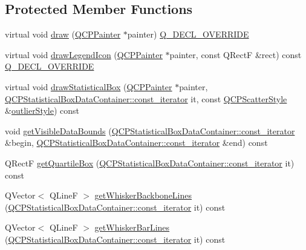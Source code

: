 \subsection*{Protected Member Functions}
\begin{DoxyCompactItemize}
\item 
virtual void \hyperlink{class_q_c_p_statistical_box_afcff35fa79728cfe10e80e0702014fea}{draw} (\hyperlink{class_q_c_p_painter}{Q\+C\+P\+Painter} $\ast$painter) \hyperlink{qcustomplot_8h_a42cc5eaeb25b85f8b52d2a4b94c56f55}{Q\+\_\+\+D\+E\+C\+L\+\_\+\+O\+V\+E\+R\+R\+I\+DE}
\item 
virtual void \hyperlink{class_q_c_p_statistical_box_ad286c63a79c21d5231a4b6c6fdbb914f}{draw\+Legend\+Icon} (\hyperlink{class_q_c_p_painter}{Q\+C\+P\+Painter} $\ast$painter, const Q\+RectF \&rect) const \hyperlink{qcustomplot_8h_a42cc5eaeb25b85f8b52d2a4b94c56f55}{Q\+\_\+\+D\+E\+C\+L\+\_\+\+O\+V\+E\+R\+R\+I\+DE}
\item 
virtual void \hyperlink{class_q_c_p_statistical_box_a02dc6b561be8203d460d7263da74b8a9}{draw\+Statistical\+Box} (\hyperlink{class_q_c_p_painter}{Q\+C\+P\+Painter} $\ast$painter, \hyperlink{class_q_c_p_data_container_ae40a91f5cb0bcac61d727427449b7d15}{Q\+C\+P\+Statistical\+Box\+Data\+Container\+::const\+\_\+iterator} it, const \hyperlink{class_q_c_p_scatter_style}{Q\+C\+P\+Scatter\+Style} \&\hyperlink{class_q_c_p_statistical_box_aef92e38fcb8e5041a44c2e01886e3b66}{outlier\+Style}) const
\item 
void \hyperlink{class_q_c_p_statistical_box_a1c24e86384a4aced91d5216fce86b175}{get\+Visible\+Data\+Bounds} (\hyperlink{class_q_c_p_data_container_ae40a91f5cb0bcac61d727427449b7d15}{Q\+C\+P\+Statistical\+Box\+Data\+Container\+::const\+\_\+iterator} \&begin, \hyperlink{class_q_c_p_data_container_ae40a91f5cb0bcac61d727427449b7d15}{Q\+C\+P\+Statistical\+Box\+Data\+Container\+::const\+\_\+iterator} \&end) const
\item 
Q\+RectF \hyperlink{class_q_c_p_statistical_box_aa44482bf991ceca74602294dd9977243}{get\+Quartile\+Box} (\hyperlink{class_q_c_p_data_container_ae40a91f5cb0bcac61d727427449b7d15}{Q\+C\+P\+Statistical\+Box\+Data\+Container\+::const\+\_\+iterator} it) const
\item 
Q\+Vector$<$ Q\+LineF $>$ \hyperlink{class_q_c_p_statistical_box_a233c28f8c2464ed104a4d580eedd4c64}{get\+Whisker\+Backbone\+Lines} (\hyperlink{class_q_c_p_data_container_ae40a91f5cb0bcac61d727427449b7d15}{Q\+C\+P\+Statistical\+Box\+Data\+Container\+::const\+\_\+iterator} it) const
\item 
Q\+Vector$<$ Q\+LineF $>$ \hyperlink{class_q_c_p_statistical_box_af478f6e8a5e9ca2f1bbac10a6b73319a}{get\+Whisker\+Bar\+Lines} (\hyperlink{class_q_c_p_data_container_ae40a91f5cb0bcac61d727427449b7d15}{Q\+C\+P\+Statistical\+Box\+Data\+Container\+::const\+\_\+iterator} it) const
\end{DoxyCompactItemize}
